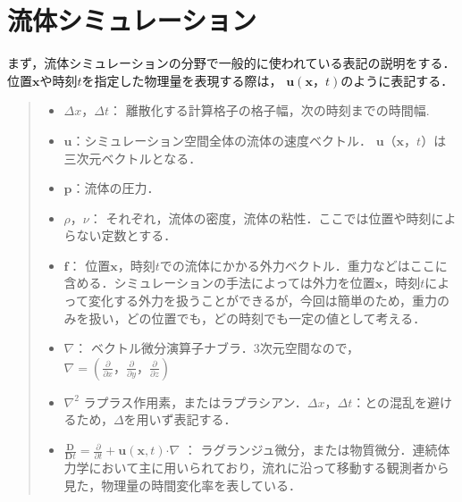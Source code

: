 \documentclass[a4j,12pt]{jreport}
\begin{document}
	\section{流体シミュレーション}\label{sec:fractional}
		まず，流体シミュレーションの分野で一般的に使われている表記の説明をする．位置$\bm{x}$や時刻$t$を指定した物理量を表現する際は，
		$\bm{u}(\bm{x}，t)$のように表記する．
		\begin{quote}
		\begin{itemize}
		\item $\varDelta x，\varDelta t：$ 離散化する計算格子の格子幅，次の時刻までの時間幅.
		\item $\bm{u}$：シミュレーション空間全体の流体の速度ベクトル．
		$\bm{u}（\bm{x}，t）$は三次元ベクトルとなる．
		\item $\bm{p}$：流体の圧力．
		\item $\rho，\nu：$ それぞれ，流体の密度，流体の粘性．ここでは位置や時刻によらない定数とする．
		\item $\bm{f}：$ 位置$\bm{x}$，時刻$t$での流体にかかる外力ベクトル．重力などはここに含める．シミュレーションの手法によっては外力を位置$\bm{x}$，時刻$t$によって変化する外力を扱うことができるが，今回は簡単のため，重力のみを扱い，どの位置でも，どの時刻でも一定の値として考える．
		\item $\nabla：$ ベクトル微分演算子ナブラ．3次元空間なので，$\nabla=  (\frac{\partial}{\partial x}，\frac{\partial}{\partial y}，\frac{\partial}{\partial z}) $ 
		\item $\nabla^2$ ラプラス作用素，またはラプラシアン．$\varDelta x，\varDelta t：$との混乱を避けるため，$\Delta$を用いず表記する．
		\item $\frac{\mathbf{D}}{\mathbf{D}t} =\frac{\partial}{\partial t} + \bm{u} (\bm{x},t)  \boldsymbol{\cdot}\nabla$ ：
		ラグランジュ微分，または物質微分．連続体力学において主に用いられており，流れに沿って移動する観測者から見た，物理量の時間変化率を表している．
	\end{itemize}
	\end{quote}
\end{document}
